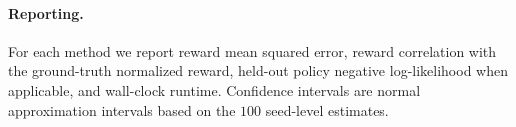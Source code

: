 \paragraph{Reporting.}
For each method we report reward mean squared error, reward correlation with
the ground-truth normalized reward, held-out policy negative log-likelihood
when applicable, and wall-clock runtime. Confidence intervals are normal
approximation intervals based on the \(100\) seed-level estimates.
